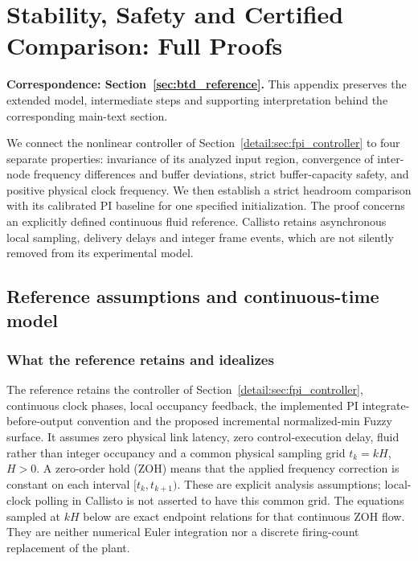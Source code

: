 \section{Stability, Safety and Certified Comparison: Full Proofs}
\label{app:theory}
\noindent\textbf{Correspondence: Section~\ref{sec:btd_reference}.} This appendix preserves the extended model, intermediate steps and supporting interpretation behind the corresponding main-text section.


\label{detail:sec:btd_reference}

We connect the nonlinear controller of Section~\ref{detail:sec:fpi_controller}
to four separate properties: invariance of its analyzed input region,
convergence of inter-node frequency differences and buffer deviations, strict buffer-capacity
safety, and positive physical clock frequency. We then establish a
strict headroom comparison with its calibrated PI baseline for one
specified initialization. The proof concerns an explicitly defined
continuous fluid reference. Callisto retains asynchronous local
sampling, delivery delays and integer frame events, which are not
silently removed from its experimental model.

\subsection{Reference assumptions and continuous-time model}
\label{detail:subsec:btd_ref_model}

\subsubsection{What the reference retains and idealizes}
The reference retains the controller of Section~\ref{detail:sec:fpi_controller}, continuous clock phases, local occupancy
feedback, the implemented PI integrate-before-output convention and the proposed
incremental normalized-min Fuzzy surface. It assumes zero physical link latency,
zero control-execution delay, fluid rather than integer occupancy and a
common physical sampling grid $t_k=kH$, $H>0$. A zero-order hold (ZOH)
means that the applied frequency correction is constant on each interval
$[t_k,t_{k+1})$. These are explicit analysis assumptions; local-clock
polling in Callisto is not asserted to have this common grid.
The equations sampled at $kH$ below are exact endpoint relations for that
continuous ZOH flow. They are neither numerical Euler integration nor a
discrete firing-count replacement of the plant.


